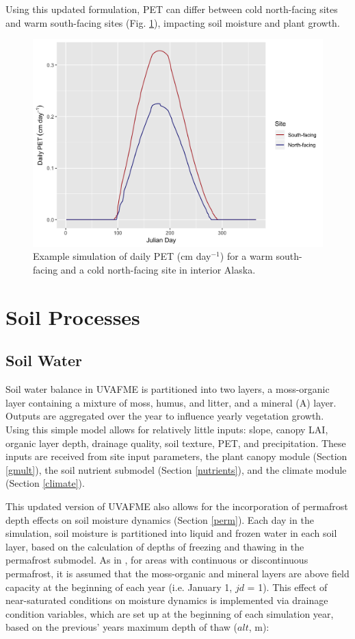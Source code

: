 \documentclass[a4paper, 12pt] {report}
\begin{document}
Using this updated formulation, PET can differ between cold north-facing sites and warm south-facing sites (Fig. \ref{fig:pet}), impacting soil moisture and plant growth.

\begin{figure}
  \includegraphics[width=0.85\linewidth]{Figures/PET.png}
  \caption{Example simulation of daily PET (cm day$^{-1}$) for a warm south-facing and a cold north-facing site in interior Alaska.}
  \label{fig:pet}
\end{figure} 

\section{Soil Processes} \label{soil}

\subsection{Soil Water} \label{soilwater}

Soil water balance in UVAFME is partitioned into two layers, a moss-organic layer containing a mixture of moss, humus, and litter, and a mineral (A) layer. Outputs are aggregated over the year to influence yearly vegetation growth. Using this simple model allows for relatively little inputs: slope, canopy LAI, organic layer depth, drainage quality, soil texture, PET, and precipitation. These inputs are received from site input parameters, the plant canopy module (Section \ref{gmult}), the soil nutrient submodel (Section \ref{nutrients}), and the climate module (Section \ref{climate}). 

This updated version of UVAFME also allows for the incorporation of permafrost depth effects on soil moisture dynamics (Section \ref{perm}). Each day in the simulation, soil moisture is partitioned into liquid and frozen water in each soil layer, based on the calculation of depths of freezing and thawing in the permafrost submodel. As in , for areas with continuous or discontinuous permafrost, it is assumed that the moss-organic and mineral layers are above field capacity at the beginning of each year (i.e. January 1, $jd$ = 1). This effect of near-saturated conditions on moisture dynamics is implemented via drainage condition variables, which are set up at the beginning of each simulation year, based on the previous' years maximum depth of thaw ($alt$, m):
\end{document}
